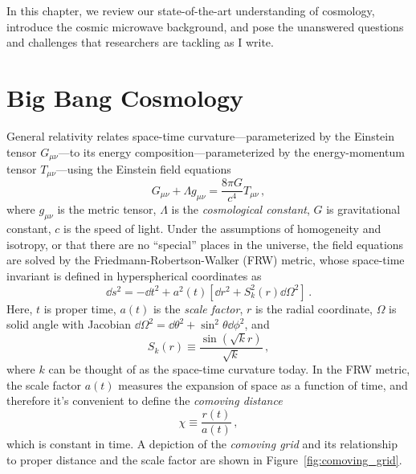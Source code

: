 In this chapter, we review our state-of-the-art understanding of cosmology, introduce the cosmic microwave background, and pose the unanswered questions and challenges that researchers are tackling as I write.


\section{Big Bang Cosmology}
\label{sec:big_bang_cosmology}

General relativity relates space-time curvature---parameterized by the Einstein tensor $G_{\mu \nu}$---to its energy composition---parameterized by the energy-momentum tensor $T_{\mu \nu}$---using the Einstein field equations
\begin{equation}
    G_{\mu \nu} + \Lambda g_{\mu \nu} = \frac{8 \pi G}{c^{4}} T_{\mu \nu} \, , 
    \label{eq:einstein_field_equations}
\end{equation}
where $g_{\mu \nu}$ is the metric tensor, $\Lambda$ is the \textit{cosmological constant}, $G$ is gravitational constant, $c$ is the speed of light. Under the assumptions of homogeneity and isotropy, or that there are no ``special'' places in the universe, the field equations are solved by the Friedmann-Robertson-Walker (FRW) metric, whose space-time invariant is defined in hyperspherical coordinates as
\begin{equation}
    \dd s^{2} = - \dd t^{2} + a^{2}(t) \left[ \dd r^{2} + S_{k}^{2}(r) \dd \Omega^{2} \right] \, .
    \label{eq:frw_metric}
\end{equation}
Here, $t$ is proper time, $a(t)$ is the \textit{scale factor}, $r$ is the radial coordinate, $\Omega$ is solid angle with Jacobian $\dd \Omega^{2} = \dd \theta^{2} + \sin^{2} \theta \dd \phi^{2}$, and
\begin{equation}
    S_{k}(r) \equiv \frac{\sin(\sqrt{k} r)}{\sqrt{k}} \, ,
    \label{eq:curvature}
\end{equation}
where $k$ can be thought of as the space-time curvature today. In the FRW metric, the scale factor $a(t)$ measures the expansion of space as a function of time, and therefore it's convenient to define the \textit{comoving distance}
\begin{equation}
    \chi \equiv \frac{r(t)}{a(t)} \, ,
    \label{eq:comoving_distance}
\end{equation}
which is constant in time. A depiction of the \textit{comoving grid} and its relationship to proper distance and the scale factor are shown in Figure~\ref{fig:comoving_grid}.

